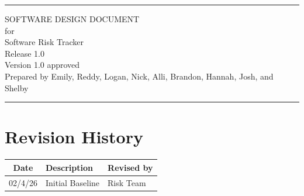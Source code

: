 \documentclass[letterpaper,12pt,oneside,listof=totoc,parskip=full]{scrreprt}
\date{\today}
\author{} %
\def\myversion{1.0 }
\begin{document}
\begin{titlepage}
\flushright
\rule{\textwidth}{5pt}\vskip1cm
\Huge{SOFTWARE DESIGN DOCUMENT}\\
\vspace{1.5cm}
for\\
\vspace{1.5cm}
Software Risk Tracker\\
\vspace{1.5cm}
\LARGE{Release 1.0\\}
\vspace{1.5cm}
\LARGE{Version \myversion approved\\}
\vspace{1.5cm}
\footnotesize Prepared by Emily, Reddy, Logan, Nick, Alli, Brandon, Hannah, Josh, and Shelby\\
\vfill
\rule{\textwidth}{5pt}
\end{titlepage}

\tableofcontents

\listoffigures

\listoftables

\chapter*{Revision History}

\begin{tabular}{| c | p{} | p{} |}
\hline
Date     & Description   & Revised by \\
\hline
02/4/26 & Initial Baseline & Risk Team \\
\hline
\end{tabular}
\end{document}
